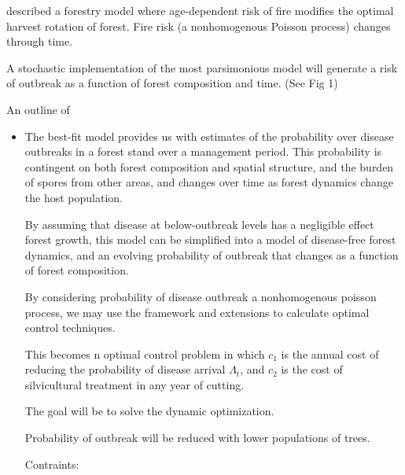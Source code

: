 \documentclass[english,nohyper,nofonts,nobib,nols,twoside]{tufte-handout}
\let\oldcitet\citet
\renewcommand{\citet}[1]{\oldcitet{#1}\cite{#1}}
\begin{document}
\citet{Reed1984} described a forestry model where age-dependent risk of
fire modifies the optimal harvest rotation of forest. Fire risk (a
nonhomogenous Poisson process) changes through time.

A stochastic implementation of the most parsimonious model will generate
a risk of outbreak as a function of forest composition and time. (See
Fig 1)

An outline of

\begin{itemize}
\item
  The best-fit model provides us with estimates of the probability over
  disease outbreaks in a forest stand over a management period. This
  probability is contingent on both forest composition and spatial
  structure, and the burden of spores from other areas, and changes over
  time as forest dynamics change the host population.

  By assuming that disease at below-outbreak levels has a negligible
  effect forest growth, this model can be simplified into a model of
  disease-free forest dynamics, and an evolving probability of outbreak
  that changes as a function of forest composition.

  By considering probability of disease outbreak a nonhomogenous poisson
  process, we may use the \citet{Reed1984} framework and extensions to
  calculate optimal control techniques.

  This becomes n optimal control problem in which $c_1$ is the annual
  cost of reducing the probability of disease arrival $\Lambda_t$, and
  $c_2$ is the cost of silvicultural treatment in any year of cutting.

  The goal will be to solve the dynamic optimization.

  Probability of outbreak will be reduced with lower populations of
  trees.

  Contraints:


\end{itemize}
\end{document}

